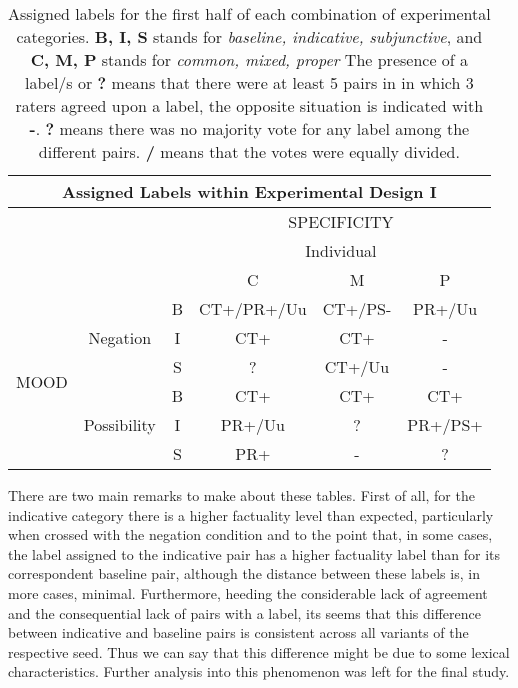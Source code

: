 \begin{table}[h!]
\centering
\begin{tabular}{|c|c|c|c|c|c|}
\hline
\multicolumn{6}{|c|}{Assigned Labels within Experimental Design I}\\\hline
& & &\multicolumn{3}{c|}{SPECIFICITY} \\\cline{4-6}
& & &\multicolumn{3}{c|}{Individual}\\\cline{4-6} 
                     & & & C & M & P \\\hline
\multirow{6}{*}{MOOD} &\multirow{3}{*}{Negation} & B & CT+/PR+/Uu & CT+/PS- & PR+/Uu \\\cline{3-6}
&& I & CT+ & CT+ & - \\\cline{3-6}
&& S & ? & CT+/Uu & - \\\cline{2-6}
&\multirow{3}{*}{Possibility}& B & CT+ & CT+ & CT+ \\\cline{3-6}
&& I & PR+/Uu & ? & PR+/PS+ \\\cline{3-6}
&& S & PR+ & - & ? \\ 
\hline
\end{tabular}
\caption[Assigned labels I.]{Assigned labels for the first half of each combination of experimental categories. \textbf{B, I, S} stands for \textit{baseline, indicative, subjunctive}, and \textbf{C, M, P} stands for \textit{common, mixed, proper} The presence of a label/s or \textbf{?} means that there were at least 5 pairs in in which 3 raters agreed upon a label, the opposite situation is indicated with \textbf{-}. \textbf{?} means there was no majority vote for any label among the different pairs. \textbf{/} means that the votes were equally divided.}
\label{tab:ass1}
\end{table}

There are two main remarks to make about these tables. First of all, for the indicative category there is a higher factuality level than expected, particularly when crossed with the negation condition and to the point that, in some cases, the label assigned to the indicative pair has a higher factuality label than for its correspondent baseline pair, although the distance between these labels is, in more cases, minimal. Furthermore, heeding the considerable lack of agreement and the consequential lack of pairs with a label, its seems that this difference between indicative and baseline pairs is consistent across all variants of the respective seed. Thus we can say that this difference might be due to some lexical characteristics. Further analysis into this phenomenon was left for the final study.\\

